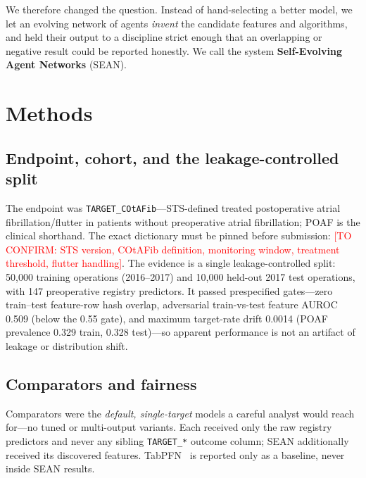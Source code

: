 \documentclass[11pt]{article}
\newcommand{\confirm}[1]{\textcolor{red}{[TO CONFIRM: #1]}}
\newcommand{\sean}{SEAN}
\begin{document}
We therefore changed the question. Instead of hand-selecting a better model, we let an
evolving network of agents \emph{invent} the candidate features and algorithms, and held
their output to a discipline strict enough that an overlapping or negative result could be
reported honestly. We call the system \textbf{Self-Evolving Agent Networks} (\sean{}).

\section{Methods}

\subsection{Endpoint, cohort, and the leakage-controlled split}
The endpoint was \texttt{TARGET\_COtAFib}---STS-defined treated postoperative atrial
fibrillation/flutter in patients without preoperative atrial fibrillation; POAF is the
clinical shorthand. The exact dictionary must be pinned before submission:
\confirm{STS version, COtAFib definition, monitoring window, treatment threshold, flutter
handling}. The evidence is a single leakage-controlled split: 50{,}000 training operations
(2016--2017) and 10{,}000 held-out 2017 test operations, with 147 preoperative registry
predictors. It passed prespecified gates---zero train--test feature-row hash overlap,
adversarial train-vs-test feature AUROC 0.509 (below the 0.55 gate), and maximum target-rate
drift 0.0014 (POAF prevalence 0.329 train, 0.328 test)---so apparent performance is not an
artifact of leakage or distribution shift.

\subsection{Comparators and fairness}
Comparators were the \emph{default, single-target} models a careful analyst would reach
for---no tuned or multi-output variants. Each received only the raw registry predictors and
never any sibling \texttt{TARGET\_*} outcome column; \sean{} additionally received its
discovered features. TabPFN~\cite{tabpfn2025} is reported only as a baseline, never inside
\sean{} results.
\end{document}
